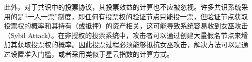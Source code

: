 









此外，对于共识中的投票协议，其投票效益的计算也不应被忽视。许多共识系统采用的是“一人一票”制度，即任何有投票权的验证节点只能投一票，但验证节点获取投票权的概率和其持有（或抵押）的资产相关\cite{gilad2017algorand,buchman2016tendermint}，这可能导致系统容易收到女巫攻击（Sybil Attack）\cite{douceur2002sybil}。在非授权的投票系统中，攻击者可以通过创建大量假名节点来增加其获取投票权的概率。因此投票过程必须能够抵抗女巫攻击，解决方法可以是通过设置准入门槛\cite{david2018ouroboros}，或者采用类似于星云指数的计算方式\cite{Nebulasyellowpaper}。



